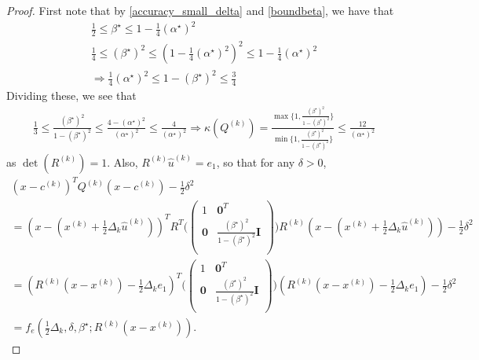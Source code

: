 \documentclass{article}
\theoremstyle{case}
\newcommand{\xk}{{x^{(k)}}}
\newcommand{\dk}{\Delta_k}
\newcommand{\qk}{{Q^{(k)}}}
\newcommand{\ck}{{c^{(k)}}}
\newcommand{\rotk}{{R^{(k)}}}
\newcommand{\huk}{{{\hat u}^{(k)}}}
\newcommand{\minanglealpha}{{ \alpha^{\star} }}
\begin{document}
\begin{proof}
First note that by \cref{accuracy_small_delta} and \cref{boundbeta}, we have that
\begin{align*}
\frac {1} 2 \le \beta^{\star} \le 1 - \frac 1 4 \left(\minanglealpha\right)^2 \\
\frac {1} 4 \le \left(\beta^{\star}\right)^2 \le \left(1 - \frac 1 4 \left(\minanglealpha\right)^2\right)^2 \le 1 - \frac 1 4 \left(\minanglealpha\right)^2 \\
\Longrightarrow 
\frac 1 4 \left(\minanglealpha\right)^2 \le 1 - \left(\beta^{\star}\right)^2 \le \frac 3 4
\end{align*}
Dividing these, we see that
\begin{align*}
\frac 1 3
\le \frac{\left(\beta^{\star}\right)^2}{1 - \left(\beta^{\star}\right)^2}
\le \frac {4 - \left(\minanglealpha\right)^2}{\left(\minanglealpha\right)^2} \le \frac {4}{\left(\minanglealpha\right)^2}
\Longrightarrow 
\kappa(\qk) 
= \frac{\max\{1, \frac{\left(\beta^{\star}\right)^2}{1 - \left(\beta^{\star}\right)^2}\}}{\min\{1, \frac{\left(\beta^{\star}\right)^2}{1 - \left(\beta^{\star}\right)^2}\}} 
\le \frac {12}{\left(\minanglealpha\right)^2}
\end{align*}
as $\det(\rotk) = 1$.
Also, $\rotk\huk = e_1$, so that for any $\delta > 0$,
\begin{align*}
\left(x - \ck\right)^T\qk\left(x - \ck\right) - \frac 1 2 \delta^2 \\
= \left(x - \left(\xk + \frac 1 2 \dk \huk\right)\right)^TR^T\bigg(\begin{pmatrix}
1 & \boldsymbol0^T \\
\boldsymbol 0 & \frac{\left(\beta^{\star}\right)^2}{1 - \left(\beta^{\star}\right)^2} \boldsymbol I \\
\end{pmatrix}\bigg) \rotk\left(x - \left(\xk + \frac 1 2 \dk \huk\right)\right) - \frac 1 2 \delta^2 \\
= \left(\rotk(x-\xk) - \frac 1 2 \dk e_1\right)^T\bigg(\begin{pmatrix}
1 & \boldsymbol0^T \\
\boldsymbol 0 & \frac{\left(\beta^{\star}\right)^2}{1 - \left(\beta^{\star}\right)^2} \boldsymbol I \\
\end{pmatrix}\bigg) \left(\rotk(x-\xk) - \frac 1 2 \dk e_1\right) - \frac 1 2 \delta^2 \\
= f_e\left(\frac 1 2 \dk, \delta, \beta^{\star}; \rotk\left(x - \xk\right)\right).
\end{align*}

\end{proof}
\end{document}
